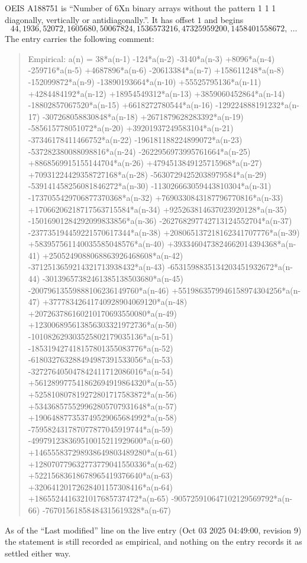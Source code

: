 \documentclass[11pt,a4paper]{article}
\theoremstyle{plain}
\theoremstyle{definition}
\begin{document}
OEIS A188751 is ``Number of 6Xn binary arrays without the pattern 1 1 1 diagonally, vertically or antidiagonally.''. It has offset $1$ and begins
\[
44, 1936, 52072, 1605680, 50067824, 1536573216, 47325959200, 1458401558672,\ \dots
\]
The entry carries the following comment:
\begin{quote}\small
Empirical: a(n) = 38*a(n-1) -124*a(n-2) -3140*a(n-3) +8096*a(n-4) -259716*a(n-5) +4687896*a(n-6) -20613384*a(n-7) +158611248*a(n-8) -152099872*a(n-9) -13890193664*a(n-10) +55525795136*a(n-11) +4284484192*a(n-12) +18954549312*a(n-13) +3859060452864*a(n-14) -18802857067520*a(n-15) +6618272780544*a(n-16) -129224888191232*a(n-17) -307268058830848*a(n-18) +2671879628283392*a(n-19) -585615778051072*a(n-20) +39201937249583104*a(n-21) -37346178411466752*a(n-22) -196181188224899072*a(n-23) -537282380088098816*a(n-24) -2622956973995761664*a(n-25) +8868569915155144704*a(n-26) +4794513849125715968*a(n-27) +70931224429358727168*a(n-28) -56307294252038979584*a(n-29) -539141458256081846272*a(n-30) -113026663059443810304*a(n-31) -1737055429706877370368*a(n-32) +7690330843187796770816*a(n-33) +17066206218717563715584*a(n-34) +925263814637023920128*a(n-35) -15016901284292099833856*a(n-36) -262768297742713124552704*a(n-37) -237735194459221570617344*a(n-38) +208065137218162341707776*a(n-39) +583957561140035585048576*a(n-40) +3933460473824662014394368*a(n-41) +2505249088068863926468608*a(n-42) -3712513659214321713938432*a(n-43) -6531598835134203451932672*a(n-44) -30139657382461385138503680*a(n-45) -20079613559888106236149760*a(n-46) +5519863579946158974304256*a(n-47) +37778342641740928904069120*a(n-48) +207263786160210170693550080*a(n-49) +123006895613856303321972736*a(n-50) -101082629303525802179035136*a(n-51) -185319427418157801355083776*a(n-52) -618032763288494987391533056*a(n-53) -327276405047842411712086016*a(n-54) +561289977541862694919864320*a(n-55) +525810807819272801717583872*a(n-56) +534368575529962805707931648*a(n-57) +190648877353749529065684992*a(n-58) -759582431787077877045919744*a(n-59) -499791238369510015211929600*a(n-60) +146555837298938649803489280*a(n-61) +128070779632773779041550336*a(n-62) +52215683618678965419376640*a(n-63) +32064120172628401157308416*a(n-64) +1865524416321017685737472*a(n-65) -905725910647102129569792*a(n-66) -76701561858484315619328*a(n-67)
\end{quote}
As of the ``Last modified'' line on the live entry (Oct 03 2025 04:49:00, revision 9) the statement is
still recorded as empirical, and nothing on the entry records it as settled either way.
\end{document}
